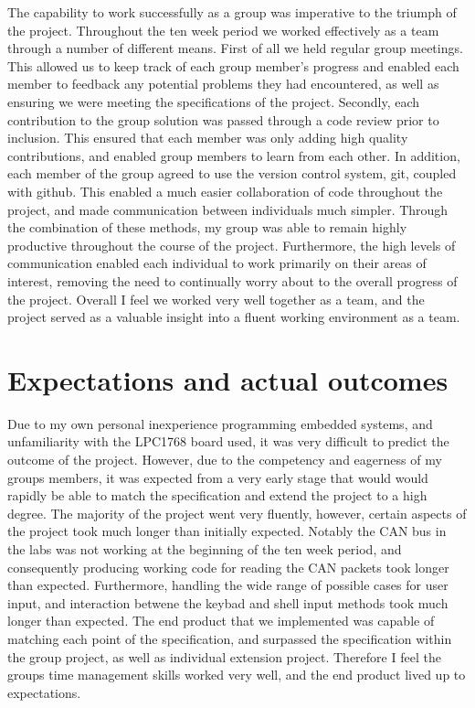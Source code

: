 The capability to work successfully as a group was imperative to the triumph of
the project. 
Throughout the ten week period we worked effectively as a team through a number 
of different means. 
First of all we held regular group meetings. This allowed us to keep track of 
each group member's progress and enabled each member to feedback any potential 
problems they had encountered, as well as ensuring we were meeting the 
specifications of the project. 
Secondly, each contribution to the group solution was passed through a code 
review prior to inclusion. 
This ensured that each member was only adding high 
quality contributions, and enabled group members to learn from each other.
In addition, each member of the group agreed to use the version control system, 
git, coupled with github. This enabled a much easier collaboration of code 
throughout the project, and made communication between individuals much simpler. 
Through the combination of these methods, my group was able to remain highly 
productive throughout the course of the project.
Furthermore, the high levels of communication enabled each individual to work 
primarily on their areas of interest, removing the need to continually worry 
about to the overall progress of the project. 
Overall I feel we worked very well together as a team, and the project served 
as a valuable insight into a fluent working environment as a team. 

\section{Expectations and actual outcomes}

Due to my own personal inexperience programming embedded systems, and 
unfamiliarity with the LPC1768 board used, it was very difficult to predict the 
outcome of the project. 
However, due to the competency and eagerness of my groups members, it was 
expected from a very early stage that would would rapidly be able to match the 
specification and extend the project to a high degree. 
The majority of the project went very fluently, however, certain aspects of the 
project took much longer than initially expected. 
Notably the CAN bus in the labs was not working at the beginning of the ten week
period, and consequently producing working code for reading the CAN packets took 
longer than expected. 
Furthermore, handling the wide range of possible cases for 
user input, and interaction betwene the keybad and shell input methods took much 
longer than expected. 
The end product that we implemented was capable of matching each point of the 
specification, and surpassed the specification within the group project, 
as well as individual extension project. 
Therefore I feel the groups time management skills worked very well, and the end 
product lived up to expectations.


